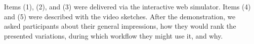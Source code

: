 \documentclass [11pt, proquest] {uwthesis}[2020/02/24]
\begin{document}

Items (1), (2), and (3) were delivered via the interactive web simulator.
Items (4) and (5) were described with the video sketches. After the demonstration, we asked participants about their general impressions, how they would rank the presented variations, during which workflow they might use it, and why.
\end{document}
